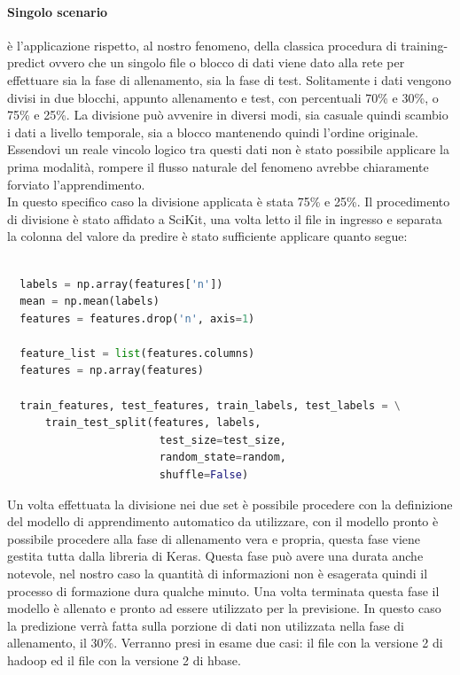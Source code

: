 \documentclass[%
    corpo=12pt,
    twoside,
    oldstyle,
    autoretitolo,
    greek,
    evenboxes,
]{toptesi}
\begin{document}
\paragraph{Singolo scenario} è l'applicazione rispetto, al nostro fenomeno, della classica procedura di training-predict ovvero che un singolo file o blocco di dati viene dato alla rete per effettuare sia la fase di allenamento, sia la fase di test. Solitamente i dati vengono divisi in due blocchi, appunto allenamento e test, con percentuali 70\% e 30\%, o 75\% e 25\%. La divisione può avvenire in diversi modi, sia casuale quindi scambio i dati a livello temporale, sia a blocco mantenendo quindi l'ordine originale. Essendovi un reale vincolo logico tra questi dati non è stato possibile applicare la prima modalità, rompere il flusso naturale del fenomeno avrebbe chiaramente forviato l'apprendimento.\\
In questo specifico caso la divisione applicata è stata 75\% e 25\%. Il procedimento di divisione è stato affidato a SciKit, una volta letto il file in ingresso e separata la colonna del valore da predire è stato sufficiente applicare quanto segue:
\begin{lstlisting}[language=Python, frame=single, basicstyle=\small]
  
  labels = np.array(features['n'])
  mean = np.mean(labels)
  features = features.drop('n', axis=1) 
  
  feature_list = list(features.columns) 
  features = np.array(features)
  
  train_features, test_features, train_labels, test_labels = \
      train_test_split(features, labels, 
                        test_size=test_size, 
                        random_state=random, 
                        shuffle=False)
\end{lstlisting}
Un volta effettuata la divisione nei due set è possibile procedere con la definizione del modello di apprendimento automatico da utilizzare, con il modello pronto è possibile procedere alla fase di allenamento vera e propria, questa fase viene gestita tutta dalla libreria di Keras. Questa fase può avere una durata anche notevole, nel nostro caso la quantità di informazioni non è esagerata quindi il processo di formazione dura qualche minuto. Una volta terminata questa fase il modello è allenato e pronto ad essere utilizzato per la previsione. In questo caso la predizione verrà fatta sulla porzione di dati non utilizzata nella fase di allenamento, il 30\%. Verranno presi in esame due casi: il file con la versione 2 di hadoop ed il file con la versione 2 di hbase.\\
\end{document}
